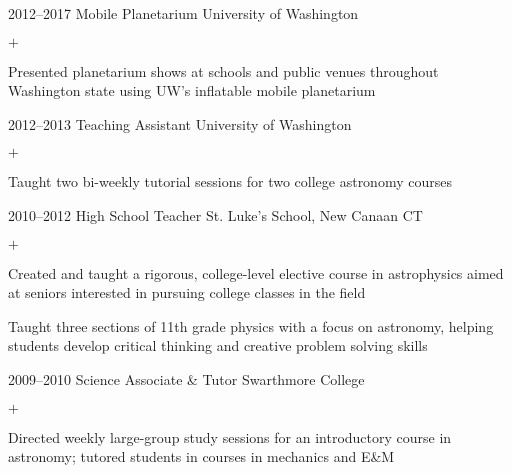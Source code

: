 \documentclass[]{luger-cv} %
\begin{document}
\begin{entrylist}


\entry
{2012--2017}
{Mobile Planetarium}
{University of Washington}
{%
\vspace{-1em}
\begin{list}{$+$}{\cvlist}
\item Presented planetarium shows at schools and public venues throughout
Washington state using UW's inflatable mobile planetarium
\end{list}
}


\entry
{2012--2013}
{Teaching Assistant}
{University of Washington}
{%
\vspace{-1em}
\begin{list}{$+$}{\cvlist}
\item Taught two bi-weekly tutorial sessions for two college astronomy courses
\end{list}
}


\entry
{2010--2012}
{High School Teacher}
{St. Luke's School, New Canaan CT}
{%
\vspace{-1em}
\begin{list}{$+$}{\cvlist}
\item Created and taught a rigorous, college-level elective course in astrophysics
aimed at seniors interested in pursuing college classes in the field
\item Taught three sections of 11th grade physics with a focus on
astronomy, helping students develop critical thinking and creative
problem solving skills
\end{list}
}


\end{entrylist}
%
%
\begin{entrylist}


\entry
{2009--2010}
{Science Associate \& Tutor}
{Swarthmore College}
{%
\vspace{-1em}
\begin{list}{$+$}{\cvlist}
\item Directed weekly large-group study sessions for an introductory course in
astronomy; tutored students in courses in mechanics and E\&M
\end{list}
}


\end{entrylist}
\end{document}
